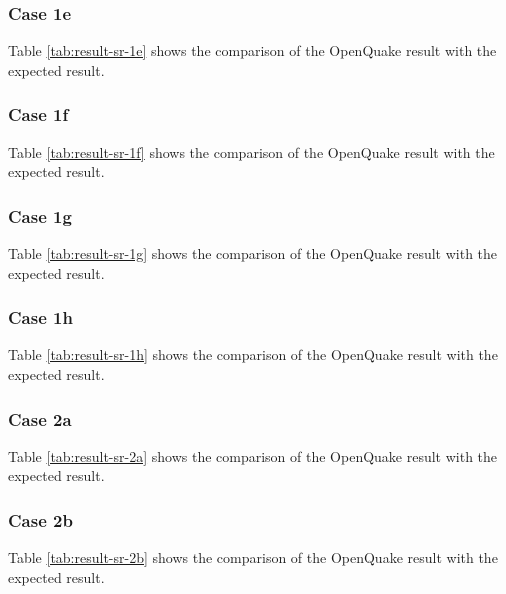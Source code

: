 \subsubsection{Case 1e}


Table \ref{tab:result-sr-1e} shows the comparison of the OpenQuake result with the expected result.

\subsubsection{Case 1f}


Table \ref{tab:result-sr-1f} shows the comparison of the OpenQuake result with the expected result.

\subsubsection{Case 1g}


Table \ref{tab:result-sr-1g} shows the comparison of the OpenQuake result with the expected result.

\subsubsection{Case 1h}


Table \ref{tab:result-sr-1h} shows the comparison of the OpenQuake result with the expected result.

\subsubsection{Case 2a}


Table \ref{tab:result-sr-2a} shows the comparison of the OpenQuake result with the expected result.

\subsubsection{Case 2b}


Table \ref{tab:result-sr-2b} shows the comparison of the OpenQuake result with the expected result.


